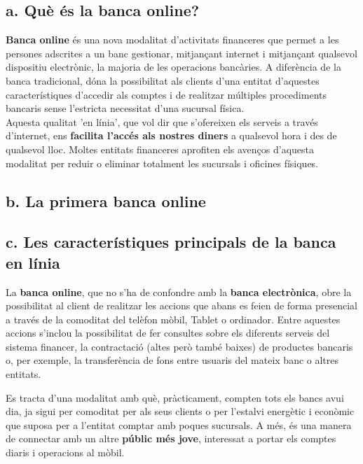 
\subsection*{a. Què és la banca online?}

\textbf{Banca online} és una nova modalitat d'activitats financeres que permet a les persones adscrites a un banc gestionar, mitjançant internet i mitjançant qualsevol dispositiu electrònic, la majoria de les operacions bancàries. A diferència de la banca tradicional, dóna la possibilitat als clients d'una entitat d'aquestes característiques d'accedir als comptes i de realitzar múltiples procediments bancaris sense l'estricta necessitat d'una sucursal física. \\



Aquesta qualitat 'en línia', que vol dir que s'ofereixen els serveis a través d'internet, ens \textbf{facilita l'accés als nostres diners} a qualsevol hora i des de qualsevol lloc. Moltes entitats financeres aprofiten els avenços d'aquesta modalitat per reduir o eliminar totalment les sucursals i oficines físiques.

\subsection*{b. La primera banca online}



\subsection*{c. Les característiques principals de la banca en línia}

La \textbf{banca online}, que no s'ha de confondre amb la \textbf{banca electrònica}, obre la possibilitat al client de realitzar les accions que abans es feien de forma presencial a través de la comoditat del telèfon mòbil, Tablet o ordinador. Entre aquestes accions s'inclou la possibilitat de fer consultes sobre els diferents serveis del sistema financer, la contractació (altes però també baixes) de productes bancaris o, per exemple, la transferència de fons entre usuaris del mateix banc o altres entitats.

Es tracta d'una modalitat amb què, pràcticament, compten tots els bancs avui dia, ja sigui per comoditat per als seus clients o per l'estalvi energètic i econòmic que suposa per a l'entitat comptar amb poques sucursals. A més, és una manera de connectar amb un altre \textbf{públic més jove}, interessat a portar els comptes diaris i operacions al mòbil.


